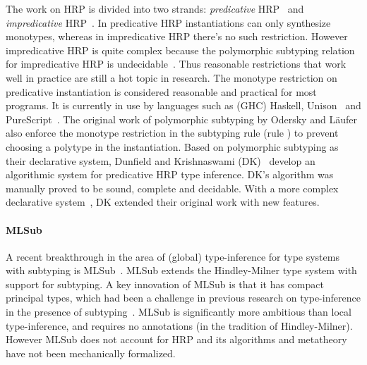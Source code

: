The work on HRP is divided into two strands: \emph{predicative} HRP~\cite{dunfield2013complete,jones2007practical,odersky1996putting,dunfield2019sound}
and \emph{impredicative} HRP~\cite{le2003ml,leijen2008hmf,vytiniotis2008fph,Serrano2018}.
In predicative HRP instantiations can
only synthesize monotypes, whereas in impredicative HRP there's no
such restriction. However impredicative HRP is quite complex because
the polymorphic subtyping relation for impredicative HRP is undecidable~\cite{tiuryn1996subtyping}.
Thus reasonable restrictions that work well in practice are still
a hot topic in research.
The monotype restriction on predicative instantiation is considered reasonable
and practical for most programs. It is currently in use by languages such as
(GHC) Haskell, Unison~\cite{Unison} and PureScript~\cite{PureScript}.
The original work of polymorphic subtyping by Odersky and L\"aufer also enforce
the monotype restriction in the subtyping rule (rule \forallL) to prevent
choosing a polytype in the instantiation. Based on polymorphic subtyping as
their declarative system,
Dunfield and Krishnaswami (DK)~\cite{dunfield2013complete} develop an
algorithmic system for predicative HRP type inference. DK's algorithm was
manually proved to be sound, complete and decidable.
With a more complex declarative system~\cite{dunfield2019sound}, DK
extended their original work with new features.

\paragraph{MLSub} A recent breakthrough in the area of (global) type-inference
for type systems with subtyping is MLSub~\cite{dolan17polymorphism}. MLSub extends the Hindley-Milner
type system with support for subtyping. A key innovation
of MLSub is that it has compact principal types, which had been a challenge
in previous research on type-inference in the presence of subtyping~\cite{eifrig95inference,Trifonov96subtyping,pottier1998inference}.
MLSub is significantly more ambitious than local type-inference, and requires
no annotations (in the tradition of Hindley-Milner). However MLSub does not
account for HRP and its algorithms and metatheory have not been mechanically
formalized.

